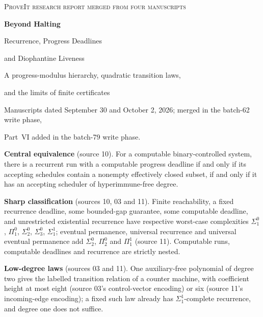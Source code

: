 \documentclass[11pt,letterpaper]{article}
\theoremstyle{definition}
\theoremstyle{remark}
\newcommand{\sig}[1]{\Sigma^{0}_{#1}}
\newcommand{\ppi}[1]{\Pi^{0}_{#1}}
\newcommand{\an}{\Sigma^{1}_{1}}
\newcommand{\1}{\mathbf 1}
\begin{document}
\hypersetup{pageanchor=false}
\begin{titlepage}
\vspace*{0.3in}
{\large\color{accent}\textsc{ProveIt research report \textperiodcentered{} merged from four manuscripts}}\par
\vspace{0.3in}
{\Huge\bfseries\color{ink} Beyond Halting}\par
\vspace{0.17in}
{\LARGE Recurrence, Progress Deadlines\par and Diophantine Liveness}\par
\vspace{0.25in}
{\large A progress-modulus hierarchy, quadratic transition laws,\par and the limits of finite certificates}\par
\vspace{0.3in}
{\normalsize Manuscripts dated September 30 and October 2, 2026; merged in the batch-62 write phase,\par Part~VI added in the batch-79 write phase.}\par
\vspace{0.3in}
\begin{resultbox}
\small
\textbf{Central equivalence} (source 10). For a computable binary-controlled system,
there is a recurrent run with a computable progress deadline if and only if
its accepting schedules contain a nonempty effectively closed subset,
if and only if it has an accepting scheduler of hyperimmune-free degree.

\textbf{Sharp classification} (sources 10, 03 and 11). Finite reachability, a fixed recurrence
deadline, some bounded-gap guarantee, some computable deadline, and
unrestricted existential recurrence have respective worst-case complexities
$\sig1$, $\ppi1$, $\sig2$, $\sig3$, $\an$; eventual permanence, universal recurrence and universal
eventual permanence add $\sig2$, $\ppi2$ and $\Pi^1_1$ (source 11).
Computable runs, computable deadlines and recurrence are strictly nested.

\textbf{Low-degree laws} (sources 03 and 11). One auxiliary-free polynomial of degree two
gives the labelled transition relation of a counter machine, with coefficient height at
most eight (source 03's control-vector encoding) or six (source 11's incoming-edge
encoding); a fixed such law already has $\an$-complete recurrence, and degree one does not suffice.


\end{resultbox}
\end{titlepage}
\end{document}
